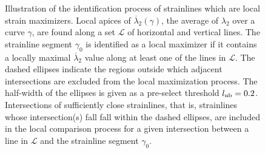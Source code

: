 \begin{figure}[htpb]
    \centering
    \def\svgwidth{0.8\linewidth}
    
    \caption[The identification process of strainlines which
    are local strain maximizers]{Illustration of the identification process of
        strainlines which are local strain maximizers.
        Local apices of $\overline{\lambda}_{2}(\gamma)$, the average of
        $\lambda_{2}$ over a curve $\gamma$, are found along a set $\mathcal{L}$
        of horizontal and vertical lines. The strainline segment
    $\gamma_{0}$ is identified as a local maximizer if it contains a locally
maximal $\overline{\lambda}_{2}$ value along at least one of the lines in
$\mathcal{L}$. The dashed ellipses indicate the regions outside which
adjacent intersections are excluded from the local maximization process.
The half-width of the ellipses is given as a pre-select threshold
$l_{\textnormal{nb}}=0.2$. Intersections of sufficiently close strainlines,
that is, strainlines whose intersection(s) fall fall within the dashed
ellipses, are included in the local comparison process for a given intersection
between a line in $\mathcal{L}$ and the strainline segment $\gamma_{0}$.}
    \label{fig:neighborlcs}
\end{figure}
